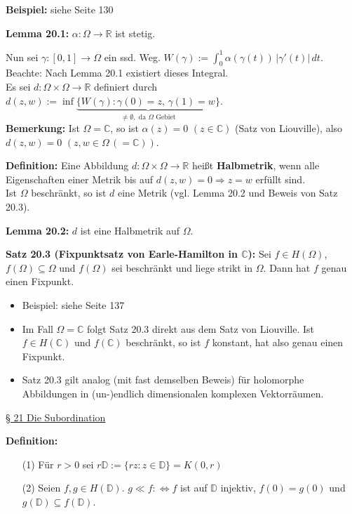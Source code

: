 \documentclass[11pt]{article}
\newcommand{\C}{\mathbb{C}}
\newcommand{\R}{\mathbb{R}}
\newcommand{\D}{\mathbb{D}}
\begin{document}
\textbf{Beispiel:} siehe Seite 130

\textbf{Lemma 20.1:} $\alpha \colon \Omega \to \R$ ist stetig.

Nun sei $\gamma \colon [0,1] \to \Omega$ ein ssd. Weg. $W(\gamma) := \int_0^1 \alpha (\gamma(t)) \, |\gamma'(t)|\, dt$. \\
Beachte: Nach Lemma 20.1 existiert dieses Integral.  \\
Es sei $d \colon \Omega \times \Omega \to \R$ definiert durch $d(z,w) := \inf \underbrace{\{ W(\gamma) \colon \gamma(0) = z, \, \gamma(1) = w \}}_{\neq \emptyset, \text{ da } \Omega \text{ Gebiet}}$. \\

\textbf{Bemerkung:} Ist $\Omega = \C$, so ist $\alpha(z) = 0$ $(z \in \C)$ (Satz von Liouville), also $d(z,w) = 0$ $(z,w \in \Omega \,(= \C))$.

\textbf{Definition:} Eine Abbildung $d \colon \Omega \times \Omega \to \R$ heißt \textbf{Halbmetrik}, wenn alle Eigenschaften einer Metrik bis auf $d(z,w) = 0 \Rightarrow z = w$ erfüllt sind.  \\
Ist $\Omega$ beschränkt, so ist $d$ eine Metrik (vgl. Lemma 20.2 und Beweis von Satz 20.3).

\textbf{Lemma 20.2:} $d$ ist eine Halbmetrik auf $\Omega$.

\textbf{Satz 20.3 (Fixpunktsatz von Earle-Hamilton in $\C$):} Sei $f \in H(\Omega)$, $f(\Omega) \subseteq \Omega$ und $f(\Omega)$ sei beschränkt und liege strikt in $\Omega$. Dann hat $f$ genau einen Fixpunkt. 
\vspace{-0.6cm}
\begin{itemize}
\item Beispiel: siehe Seite 137 \vspace{-0.2cm}
\item Im Fall $\Omega = \C$ folgt Satz 20.3 direkt aus dem Satz von Liouville. Ist $f \in H(\C)$ und $f(\C)$ beschränkt, so ist $f$ konstant, hat also genau einen Fixpunkt. \vspace{-0.2cm}
\item Satz 20.3 gilt analog (mit fast demselben Beweis) für holomorphe Abbildungen in (un-)endlich dimensionalen komplexen Vektorräumen.
\end{itemize}
\vspace{-0.3cm}

\underline{§ 21 Die Subordination}

\textbf{Definition:} 
\vspace{-0.6cm}
\begin{itemize}
\item[(1)] Für $r > 0$ sei $r \D := \{ rz \colon z \in \D \} = K(0,r)$ \vspace{-0.2cm}
\item[(2)] Seien $f,g \in H(\D)$. $g \ll f :\Leftrightarrow f$ ist auf $\D$ injektiv, $f(0) = g(0)$ und $g(\D) \subseteq f(\D)$.
\end{itemize}
\vspace{-0.3cm}
\end{document}
